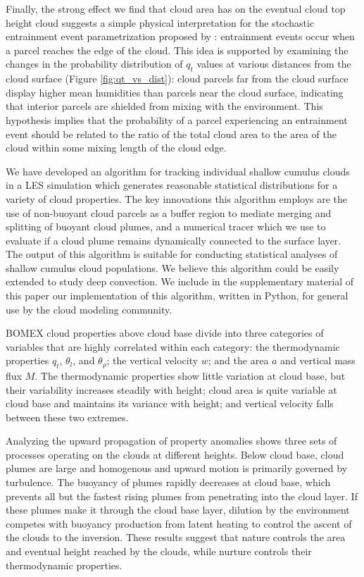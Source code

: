 \documentclass[acp]{copernicus}
\begin{document}
Finally, the strong effect we find that cloud area has on the eventual cloud 
top height cloud suggests a simple physical interpretation for the stochastic 
entrainment event parametrization proposed by \cite{Romps2010a}: entrainment 
events occur when a parcel reaches the edge of the cloud. This idea is 
supported by examining the changes in the probability distribution of $q_t$ 
values at various distances from the cloud surface (Figure 
\ref{fig:qt_vs_dist}): cloud parcels far from the cloud surface display higher
mean humidities than parcels near the cloud surface, indicating that interior 
parcels are shielded from mixing with the environment.  This hypothesis 
implies that the probability of a parcel experiencing an entrainment event 
should be related to the ratio of the total cloud area to the area of the 
cloud within some mixing length of the cloud edge.


\conclusions
We have developed an algorithm for tracking individual shallow cumulus clouds 
in a LES simulation which generates reasonable statistical distributions for a 
variety of cloud properties.  The key innovations this algorithm employs are 
the use of non-buoyant cloud parcels as a buffer region to mediate merging and 
splitting of buoyant cloud plumes, and a numerical tracer which we use to 
evaluate if a cloud plume remains dynamically connected to the surface layer.  
The output of this algorithm is suitable for conducting statistical 
analyses of shallow cumulus cloud populations.  We believe this algorithm could 
be easily extended to study deep convection.  We include in the supplementary 
material of this paper our implementation of this algorithm, written in Python, 
for general use by the cloud modeling community.

BOMEX cloud properties above cloud base divide into three categories of 
variables that are highly correlated within each category: the thermodynamic 
properties $q_t$, $\theta_l$, and $\theta_\rho$; the vertical velocity $w$; 
and the area $a$ and vertical mass flux $M$.  The thermodynamic properties show 
little variation at cloud base, but their variability increases steadily with 
height; cloud area is quite variable at cloud base and maintains its variance 
with height; and vertical velocity falls between these two extremes.

Analyzing the upward propagation of property anomalies shows three sets of 
processes operating on the clouds at different heights.  Below cloud base, 
cloud plumes are large and homogenous and upward motion is primarily governed 
by turbulence.  The buoyancy of plumes rapidly decreases at cloud base, which 
prevents all but the fastest rising plumes from penetrating into the cloud 
layer.  If these plumes make it through the cloud base layer, dilution by the 
environment competes with buoyancy production from latent heating to control 
the ascent of the clouds to the inversion.  These results suggest that 
nature controls the area and eventual height reached by the clouds, while 
nurture controls their thermodynamic properties.
\end{document}
